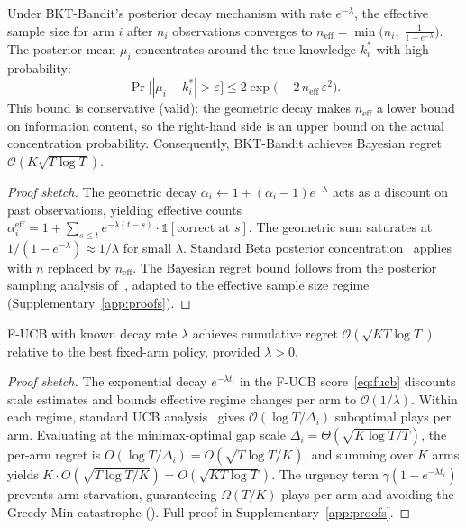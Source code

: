 \begin{theorem}
\label{thm:bkt}
Under BKT-Bandit's posterior decay mechanism with rate $e^{-\lambda}$, the effective sample size for arm $i$ after $n_i$ observations converges to $n_{\mathrm{eff}} = \min\!\bigl(n_i,\; \frac{1}{1 - e^{-\lambda}}\bigr)$. The posterior mean $\mu_i$ concentrates around the true knowledge $k_i^*$ with high probability:
\begin{equation}
    \Pr\bigl[|\mu_i - k_i^*| > \varepsilon\bigr] \leq 2\exp\!\bigl(-2\, n_{\mathrm{eff}}\, \varepsilon^2\bigr).
    \label{eq:bkt_concentration}
\end{equation}
This bound is conservative (valid): the geometric decay makes $n_{\mathrm{eff}}$ a lower bound on information content, so the right-hand side is an upper bound on the actual concentration probability.
Consequently, BKT-Bandit achieves Bayesian regret $\mathcal{O}(K\sqrt{T \log T})$.
\end{theorem}

\begin{proof}[Proof sketch]
The geometric decay $\alpha_i \leftarrow 1 + (\alpha_i - 1) e^{-\lambda}$ acts as a discount on past observations, yielding effective counts $\alpha_i^{\mathrm{eff}} = 1 + \sum_{s \leq t} e^{-\lambda(t-s)} \cdot \mathbb{1}[\text{correct at } s]$. The geometric sum saturates at $1/(1{-}e^{-\lambda}) \approx 1/\lambda$ for small $\lambda$. Standard Beta posterior concentration~\citep{lattimore2020bandit} applies with $n$ replaced by $n_{\mathrm{eff}}$. The Bayesian regret bound follows from the posterior sampling analysis of~\citet{russo2014learning}, adapted to the effective sample size regime (Supplementary~\ref{app:proofs}).
\end{proof}

\begin{theorem}
\label{thm:fucb}
F-UCB with known decay rate $\lambda$ achieves cumulative regret $\mathcal{O}(\sqrt{KT\log T})$ relative to the best fixed-arm policy, provided $\lambda > 0$.
\end{theorem}

\begin{proof}[Proof sketch]
The exponential decay $e^{-\lambda t_i}$ in the F-UCB score~\eqref{eq:fucb} discounts stale estimates and bounds effective regime changes per arm to $\mathcal{O}(1/\lambda)$. Within each regime, standard UCB analysis~\citep{auer2002finite} gives $\mathcal{O}(\log T/\Delta_i)$ suboptimal plays per arm. Evaluating at the minimax-optimal gap scale $\Delta_i = \Theta(\sqrt{K\log T / T})$, the per-arm regret is $O(\log T / \Delta_i) = O(\sqrt{T\log T / K})$, and summing over $K$ arms yields $K \cdot O(\sqrt{T\log T/K}) = O(\sqrt{KT\log T})$. The urgency term $\gamma(1-e^{-\lambda t_i})$ prevents arm starvation, guaranteeing $\Omega(T/K)$ plays per arm and avoiding the Greedy-Min catastrophe (). Full proof in Supplementary~\ref{app:proofs}.
\end{proof}

